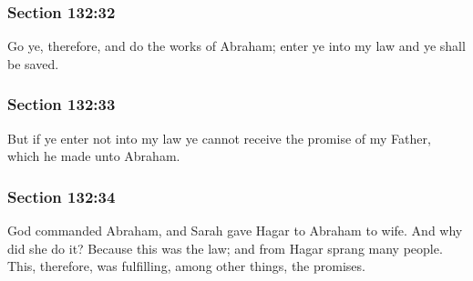 	\subsubsection{Section 132:32} %
		\label{DC132-32}

		Go ye, therefore, and do the works of Abraham; enter ye into my law and ye shall be saved.


	\subsubsection{Section 132:33} %
		\label{DC132-33}

		But if ye enter not into my law ye cannot receive the promise of my Father, which he made unto Abraham.


	\subsubsection{Section 132:34} %
		\label{DC132-34}

		God commanded Abraham, and Sarah gave Hagar to Abraham to wife. And why did she do it? Because this was the law; and from Hagar sprang many people. This, therefore, was fulfilling, among other things, the promises.


